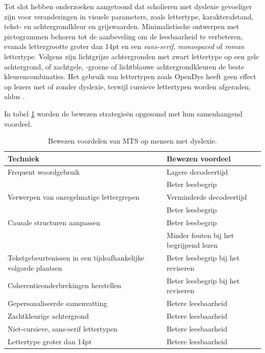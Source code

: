 \medspace

Tot slot hebben onderzoeken aangetoond dat scholieren met dyslexie gevoeliger zijn voor veranderingen in visuele parameters, zoals lettertype, karakterafstand, tekst- en achtergrondkleur en grijswaarden. Minimalistische ontwerpen met pictogrammen behoren tot de aanbeveling om de leesbaarheid te verbeteren, evanals lettergrootte groter dan 14pt en een \textit{sans-serif}, \textit{monospaced} of \textit{roman} lettertype. Volgens \textcite{Rello2015, Bezem2016, Rello2017} zijn lichtgrijze achtergronden met zwart lettertype op een gele achtergrond, of zachtgele, -groene of lichtblauwe achtergrondkleuren de beste kleurencombinaties. Het gebruik van lettertypen zoals OpenDys heeft geen effect op lezers met of zonder dyslexie, terwijl cursieve lettertypen worden afgeraden, aldus \textcite{Rello2013b, Rello2015}.

\medspace

In tabel \ref{table:benefits-mts} worden de bewezen strategieën opgesomd met hun samenhangend voordeel.

\medspace

\begin{center}
	\begin{table}[H]
	\begin{tabular}{ | m{7cm} | m{7cm} | } 
	\hline
	\textbf{Techniek} & \textbf{Bewezen voordeel} \\
	\hline
	Frequent woordgebruik & Lagere decodeertijd \\
	& Beter leesbegrip \\
	\hline	
	Verwerpen van onregelmatige lettergrepen & Verminderde decodeertijd \\
	& Beter leesbegrip \\	
	\hline
	Causale structuren aanpassen & Beter leesbegrip \\
	& Minder fouten bij het begrijpend lezen \\
	\hline	
	Tekstgebeurtenissen in een tijdsafhankelijke volgorde plaatsen & Beter leesbegrip bij het reviseren \\
	\hline
	Coherentieonderbrekingen herstellen & Beter leesbegrip bij het reviseren \\
	\hline
	Gepersonaliseerde samenvatting & Betere leesbaarheid \\
	\hline
	Zachtkleurige achtergrond & Betere leesbaarheid \\
	\hline
	Niet-cursieve, sans-serif lettertypen & Betere leesbaarheid \\
	\hline
	Lettertype groter dan 14pt & Betere leesbaarheid \\
	\hline
	\end{tabular}
	\caption{Bewezen voordelen van MTS op mensen met dyslexie.}
	\label{table:benefits-mts}
	\end{table}
\end{center}

